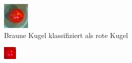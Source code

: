 \begin{figure}[h!]
\begin{subfigure}[b]{0.2\textwidth}
                \includegraphics[width=1.0\linewidth]{../common/04_results/resources/classification/failed_classification_RED_BROWN_3_original.png}
                \caption{Braune Kugel klassifiziert als rote Kugel}
                \label{fig:classification_results_failed_classification_RED_BROWN_3_original}
        \end{subfigure}
        \hfill
        \begin{subfigure}[b]{0.2\textwidth}
                \centering
                \includegraphics[width=1.0\linewidth]{../common/04_results/resources/classification/failed_classification_BROWN_RED_5_roi.png}

\end{subfigure}
\end{figure}
